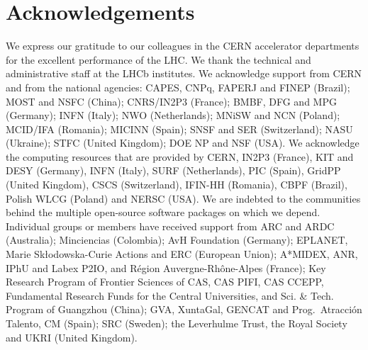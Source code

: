 \section*{Acknowledgements}
%
%
\noindent We express our gratitude to our colleagues in the CERN
accelerator departments for the excellent performance of the LHC. We
thank the technical and administrative staff at the LHCb
institutes.
We acknowledge support from CERN and from the national agencies:
CAPES, CNPq, FAPERJ and FINEP (Brazil); 
MOST and NSFC (China); 
CNRS/IN2P3 (France); 
BMBF, DFG and MPG (Germany); 
INFN (Italy); 
NWO (Netherlands); 
MNiSW and NCN (Poland); 
MCID/IFA (Romania); 
MICINN (Spain); 
SNSF and SER (Switzerland); 
NASU (Ukraine); 
STFC (United Kingdom); 
DOE NP and NSF (USA).
We acknowledge the computing resources that are provided by CERN, IN2P3
(France), KIT and DESY (Germany), INFN (Italy), SURF (Netherlands),
PIC (Spain), GridPP (United Kingdom), 
CSCS (Switzerland), IFIN-HH (Romania), CBPF (Brazil),
Polish WLCG  (Poland) and NERSC (USA).
We are indebted to the communities behind the multiple open-source
software packages on which we depend.
Individual groups or members have received support from
ARC and ARDC (Australia);
Minciencias (Colombia);
AvH Foundation (Germany);
EPLANET, Marie Sk\l{}odowska-Curie Actions and ERC (European Union);
A*MIDEX, ANR, IPhU and Labex P2IO, and R\'{e}gion Auvergne-Rh\^{o}ne-Alpes (France);
Key Research Program of Frontier Sciences of CAS, CAS PIFI, CAS CCEPP, 
Fundamental Research Funds for the Central Universities, 
and Sci. \& Tech. Program of Guangzhou (China);
GVA, XuntaGal, GENCAT and Prog.~Atracci\'on Talento, CM (Spain);
SRC (Sweden);
the Leverhulme Trust, the Royal Society
 and UKRI (United Kingdom).

